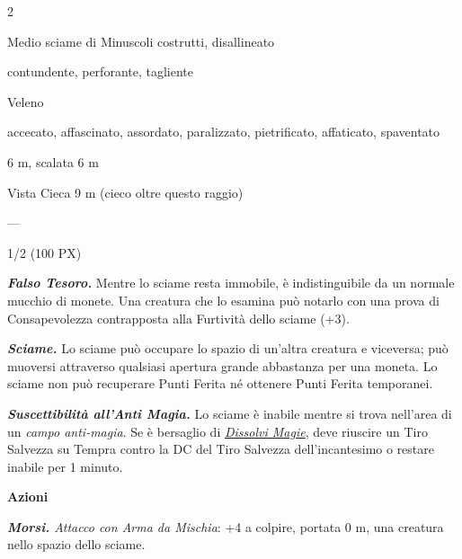 \begin{multicols}{2}
{
\begin{description}[noitemsep, topsep=0pt, parsep=0pt, partopsep=0pt, itemsep=1pt, leftmargin=2.35cm,  labelwidth=2.2cm, itemindent=0cm, listparindent=0pt] %
\setlength{\baselineskip}{10pt}
\item[\textbf{Taglia/Tipo}] Medio sciame di Minuscoli costrutti, disallineato
\item[\textbf{Caratt.}] 
\item[\textbf{Punti Ferita}] 
\item[\textbf{Resistenze al danno}] contundente, perforante, tagliente
\item[\textbf{Tiri Salvez.}] 
\item[\textbf{Imm. Danni}] Veleno
\item[\textbf{Immunità}] accecato, affascinato, assordato, paralizzato, pietrificato, affaticato, spaventato
\item[\textbf{Movimento}] 6 m, scalata 6 m
\item[\textbf{Sensi}] Vista Cieca 9 m (cieco oltre questo raggio)
\item[\textbf{Linguaggi}] —
\item[\textbf{Sfida}] 1/2 (100 PX)
\end{description}
\smallskip

\emph{\textbf{Falso Tesoro.}} Mentre lo sciame resta immobile, è indistinguibile da un normale mucchio di monete. Una creatura che lo esamina può notarlo con una prova di Consapevolezza contrapposta alla Furtività dello sciame (+3).

\emph{\textbf{Sciame.}} Lo sciame può occupare lo spazio di un'altra creatura e viceversa; può muoversi attraverso qualsiasi apertura grande abbastanza per una moneta. Lo sciame non può recuperare Punti Ferita né ottenere Punti Ferita temporanei.

\emph{\textbf{Suscettibilità all'Anti Magia.}} Lo sciame è inabile mentre si trova nell'area di un \emph{campo anti-magia}. Se è bersaglio di \emph{\hyperlink{Dissolvi Magie}{Dissolvi Magie}}, deve riuscire un Tiro Salvezza su Tempra contro la DC del Tiro Salvezza dell'incantesimo o restare inabile per 1 minuto.

\textbf{Azioni}

\emph{\textbf{Morsi.} Attacco con Arma da Mischia}: +4 a colpire, portata 0 m, una creatura nello spazio dello sciame.

}
\end{multicols}
